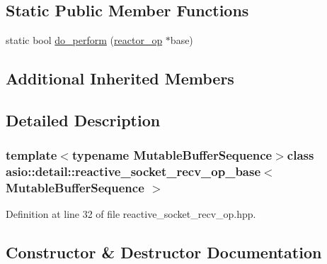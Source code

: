 \subsection*{Static Public Member Functions}
\begin{DoxyCompactItemize}
\item 
static bool \hyperlink{classasio_1_1detail_1_1reactive__socket__recv__op__base_a47be9d035158fcad65f47acb82970066}{do\+\_\+perform} (\hyperlink{classasio_1_1detail_1_1reactor__op}{reactor\+\_\+op} $\ast$base)
\end{DoxyCompactItemize}
\subsection*{Additional Inherited Members}


\subsection{Detailed Description}
\subsubsection*{template$<$typename Mutable\+Buffer\+Sequence$>$class asio\+::detail\+::reactive\+\_\+socket\+\_\+recv\+\_\+op\+\_\+base$<$ Mutable\+Buffer\+Sequence $>$}



Definition at line 32 of file reactive\+\_\+socket\+\_\+recv\+\_\+op.\+hpp.



\subsection{Constructor \& Destructor Documentation}
\hypertarget{classasio_1_1detail_1_1reactive__socket__recv__op__base_a0c34653eaf19bd85a38551d2b854c72a}{}

